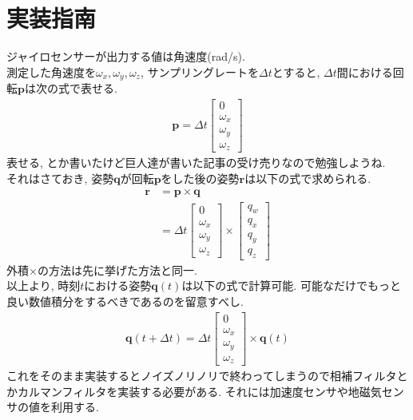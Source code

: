 \documentclass[a4j]{jsarticle}
\begin{document}
\section{実装指南}
ジャイロセンサーが出力する値は角速度(rad/s). \\
測定した角速度を$\omega_x, \omega_y, \omega_z$, サンプリングレートを$\Delta t$とすると, $\Delta t$間における回転$\bm{p}$は次の式で表せる.
\begin{align}
    \bm{p} = \Delta t\left[
        \begin{array}{c}
            0 \\
            \omega_x \\
            \omega_y \\
            \omega_z 
        \end{array}
    \right] \nonumber
\end{align}
表せる, とか書いたけど巨人達が書いた記事の受け売りなので勉強しようね. \\
それはさておき, 姿勢$\bm{q}$が回転$\bm{p}$をした後の姿勢$\bm{r}$は以下の式で求められる.
\begin{align}
    \bm{r} &= \bm{p} \times \bm{q} \nonumber \\
           &= \Delta t
           \left[
                \begin{array}{c}
                    0 \\
                    \omega_x \\
                    \omega_y \\
                    \omega_z
                \end{array}
           \right] \times
           \left[
                \begin{array}{c}
                    q_w \\
                    q_x \\
                    q_y \\
                    q_z
                \end{array}
           \right] \nonumber
\end{align}
外積$\times$の方法は先に挙げた方法と同一. \\
以上より, 時刻$t$における姿勢$\bm{q}(t)$は以下の式で計算可能. 可能なだけでもっと良い数値積分をするべきであるのを留意すべし.
\begin{align}
    \bm{q}(t+\Delta t) = \Delta t
                       \left[
                            \begin{array}{c}
                                0 \\
                                \omega_x \\
                                \omega_y \\
                                \omega_z 
                            \end{array}
                       \right] \times \bm{q}(t) \nonumber
\end{align}
これをそのまま実装するとノイズノリノリで終わってしまうので相補フィルタとかカルマンフィルタを実装する必要がある. それには加速度センサや地磁気センサの値を利用する.
\end{document}
